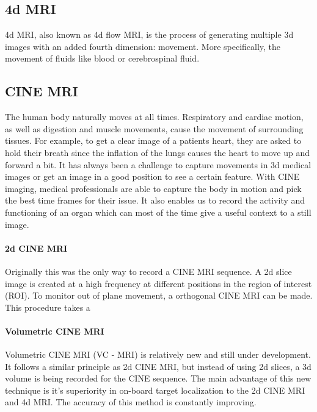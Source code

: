   \subsection{4d MRI}
  \label{4d MRI}
  4d MRI, also known as 4d flow MRI, is the process of generating multiple 3d images with an added fourth dimension: movement. More specifically, the movement of fluids like blood or cerebrospinal fluid.
  \cite{bunckMagneticResonance4D2012a}
  \cite{stankovic4DFlowImaging2014}

  \subsection{CINE MRI}
   \label{CINE MRI}
    The human body naturally moves at all times. Respiratory and cardiac motion, as well as digestion and muscle movements, cause the movement of surrounding tissues. For example, to get a clear image of a patients heart, they are asked to hold their breath since the inflation of the lungs causes the heart to move up and forward a bit. It has always been a challenge to capture movements in 3d medical images or get an image in a good position to see a certain feature. With CINE imaging, medical professionals are able to capture the body in motion and pick the best time frames for their issue. It also enables us to record the activity and functioning of an organ which can most of the time give a useful context to a still image.

   \paragraph{2d CINE MRI}
   Originally this was the only way to record a CINE MRI sequence. A 2d slice image is created at a high frequency at different positions in the region of interest (ROI).
   To monitor out of plane movement, a orthogonal CINE MRI can be made. This procedure takes a

  \paragraph{Volumetric CINE MRI}
  Volumetric CINE MRI (VC - MRI) is relatively new and still under development. It follows a similar principle as 2d CINE MRI, but instead of using 2d slices, a 3d volume is being recorded for the CINE sequence.
  The main advantage of this new technique is it's superiority in on-board target localization to the 2d CINE MRI and 4d MRI. The accuracy of this method is constantly improving.
  \cite{harrisVolumetricCineMagnetic2020}

